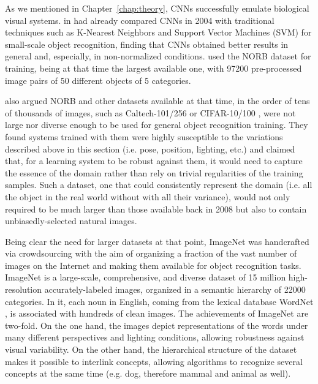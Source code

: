 As we mentioned in Chapter~\ref{chap:theory}, CNNs successfully emulate biological visual systems.
\citeauthor{LeCun2004B} in \cite{LeCun2004B} had already compared CNNs in 2004 with traditional techniques such as K-Nearest Neighbors and Support Vector Machines (SVM) for small-scale object recognition, finding that CNNs obtained better results in general and, especially, in non-normalized conditions.
\citeauthor{LeCun2004B} used the NORB dataset for training, being at that time the largest available one, with 97200 pre-processed image pairs of 50 different objects of 5 categories.

\citeauthor{Pinto2008} also argued NORB and other datasets available at that time, in the order of tens of thousands of images, such as Caltech-101/256 \cite{Fei-Fei2007,Griffin2007} or CIFAR-10/100 \cite{Krizhevsky2009}, were not large nor diverse enough to be used for general object recognition training.
They found systems trained with them were highly susceptible to the variations described above in this section (i.e. pose, position, lighting, etc.) and claimed that, for a learning system to be robust against them, it would need to capture the essence of the domain rather than rely on trivial regularities of the training samples.
Such a dataset, one that could consistently represent the domain (i.e. all the object in the real world without with all their variance), would not only required to be much larger than those available back in 2008 but also to contain unbiasedly-selected natural images.

Being clear the need for larger datasets at that point, ImageNet \cite{Deng2009} was handcrafted via crowdsourcing with the aim of organizing a fraction of the vast number of images on the Internet and making them available for object recognition tasks.
ImageNet is a large-scale, comprehensive, and diverse dataset of 15 million high-resolution accurately-labeled images, organized in a semantic hierarchy of 22000 categories.
In it, each noun in English, coming from the lexical database WordNet \cite{Wilkniss1998}, is associated with hundreds of clean images.
The achievements of ImageNet are two-fold.
On the one hand, the images depict representations of the words under many different perspectives and lighting conditions, allowing robustness against visual variability.
On the other hand, the hierarchical structure of the dataset makes it possible to interlink concepts, allowing algorithms to recognize several concepts at the same time (e.g. dog, therefore mammal and animal as well).

